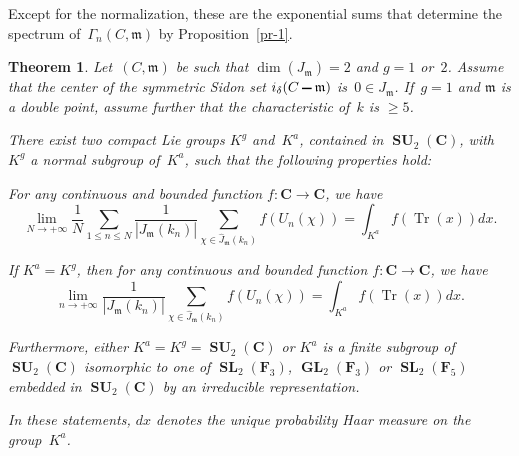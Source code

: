 \documentclass[12pt]{amsart}
\renewcommand{\leq}{\leqslant}
\renewcommand{\geq}{\geqslant}
\numberwithin{equation}{section}
\def\setminus{\mathchoice
    {\mathbin{\vrule height .62ex width 1.61ex depth -.38ex}}%
    {\mathbin{\vrule height .62ex width 1.61ex depth -.38ex}}%
    {\mathbin{\vrule height .50ex width 0.85ex depth -.28ex}}%
    {\mathbin{\vrule height .20ex width 0.570ex depth -.24ex}}%
}
\newcommand{\Cc}{\mathbf{C}}
\newcommand{\Ff}{\mathbf{F}}
\newcommand{\mfm}{\mathfrak{m}}
\DeclareMathOperator{\Tr}{Tr}
\DeclareMathOperator{\SL}{\mathbf{SL}}
\DeclareMathOperator{\GL}{\mathbf{GL}}
\DeclareMathOperator{\SU}{\mathbf{SU}}
\theoremstyle{plain}
\newtheorem{theorem}{Theorem}[section]
\theoremstyle{remark}
\theoremstyle{definition}
\renewcommand{\geq}{\geqslant}
\renewcommand{\leq}{\leqslant}
\begin{document}
Except for the normalization, these are the exponential sums that
determine the spectrum of~$\Gamma_n(C,\mfm)$ by Proposition~\ref{pr-1}.

\begin{theorem}\label{th-equi}
  Let~$(C,\mfm)$ be such that $\dim(J_{\mfm})=2$ and $g=1$ or~$2$.
  Assume that the center of the symmetric Sidon set
  $i_{\delta}(C\setminus\mfm)$ is~$0\in J_{\mfm}$. If~$g=1$ and $\mfm$
  is a double point, assume further that the characteristic of~$k$ is
  $\geq 5$.

  There exist two compact Lie groups $K^g$ and~$K^a$, contained in
  $\SU_2(\Cc)$, with $K^g$ a normal subgroup of~$K^a$, such that the
  following properties hold:
  \begin{enumth}
  \item\label{it-equid1} For any continuous and bounded function
    $f\colon \Cc\to \Cc$, we have
    \[
      \lim_{N\to +\infty}\frac{1}{N}\sum_{1\leq n\leq N}
      \frac{1}{|J_{\mfm}(k_n)|}\sum_{\chi\in \widehat{J}_{\mfm}(k_n)}
      f(U_n(\chi))=\int_{K^a}f(\Tr(x))dx.
    \]
    
  \item If $K^a=K^g$, then for any continuous and bounded function
    $f\colon \Cc\to \Cc$, we have
    \[
      \lim_{n\to +\infty} \frac{1}{|J_{\mfm}(k_n)|}\sum_{\chi\in
        \widehat{J}_{\mfm}(k_n)} f(U_n(\chi))=\int_{K^a}f(\Tr(x))dx.
    \]

  \item\label{it-equid3} Furthermore, either $K^a=K^g=\SU_2(\Cc)$ or $K^a$ is a finite
    subgroup of~$\SU_2(\Cc)$ isomorphic to one of $\SL_2(\Ff_3)$,
    $\GL_2(\Ff_3)$ or $\SL_2(\Ff_5)$ embedded in $\SU_2(\Cc)$ by an
    irreducible representation.
  \end{enumth}

  In these statements, $dx$ denotes the unique probability Haar measure
  on the group~$K^a$.
\end{theorem}
\end{document}
